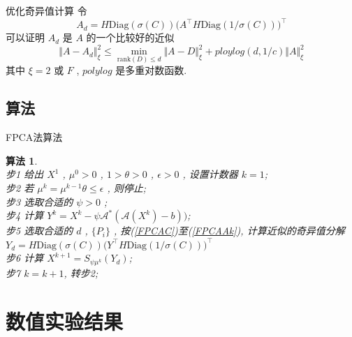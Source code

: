 \documentclass[slidestop, compress, mathserif, UTF8]{beamer}
\newtheorem{algo}{\bf \textcolor[rgb]{0.8,0,0}{算法}}
\numberwithin{equation}{section}                                        %
\begin{document}
            \begin{frame}[t]{优化奇异值计算}
                令
                \begin{equation}\label{FPCAAk}
                        A_d
                    =	H \text{Diag}(\sigma(C)) \big(A ^\top H \text{Diag}(1/\sigma(C))\big)^\top
                \end{equation}
                可以证明 $A_d$ 是 $A$ 的一个比较好的近似
                \begin{equation}
                        \Vert{A - A_d}\Vert^2_\xi 
                    \le	\min_{\text{rank}(D) \le d} \Vert{A - D}\Vert^2_\xi + ploylog(d, 1/c) \Vert{A}\Vert^2_\xi
                \end{equation}
                其中 $\xi = 2 \text{ 或 } F$ , $polylog$ 是多重对数函数.
            \end{frame}
        \subsection{算法}
            \begin{frame}[t]{FPCA法算法}
                \begin{algo}
                    \quad\\
                    步1 \quad 给出 $X^1$ , $\mu^0 > 0$ , $1 > \theta > 0$ , $\epsilon > 0$ , 设置计数器 $k = 1$;\\
                    步2 \quad 若 $\mu^k = \mu^{k -1} \theta \le \epsilon$ , 则停止;\\
                    步3 \quad 选取合适的 $\psi > 0$ ;\\
                    步4 \quad 计算 $Y^k = X^k - \psi \mathcal{A}^*(\mathcal{A}(X^k) - b))$;\\
                    步5 \quad 选取合适的 $d$ , $\{P_i\}$ , 按(\ref{FPCAC})至(\ref{FPCAAk}), 计算近似的奇异值分解 $Y_d = H \text{Diag}(\sigma(C)) \big(Y ^\top H \text{Diag}(1/\sigma(C))\big)^\top$\\
                    步6 \quad 计算 $X^{k + 1} = S_{\psi \mu^k}(Y_d)$;\\
                    步7 \quad $k = k + 1$, 转步2;
                \end{algo}
            \end{frame}
    \section{数值实验结果}\label{section5}
\end{document}
